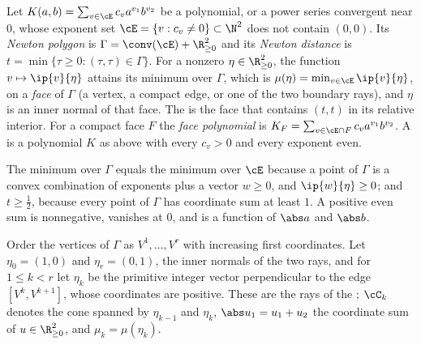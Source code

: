 \begin{refsection}
\begin{definition}\label{def:newton:polygon}
Let $K(a,b)=\sum_{v\in\cE}c_va^{v_1}b^{v_2}$ be a polynomial, or a power series convergent near $0$, whose exponent set $\cE=\{v:c_v\ne0\}\subset\N^2$ does not contain $(0,0)$. Its \emph{Newton polygon} is $\Gamma=\conv(\cE)+\R^2_{\ge0}$ and its \emph{Newton distance} is $t=\min\{\tau\ge0:(\tau,\tau)\in\Gamma\}$. For a nonzero $\eta\in\R^2_{\ge0}$, the function $v\mapsto\ip{v}{\eta}$ attains its minimum over $\Gamma$, which is $\mu(\eta)=\min_{v\in\cE}\ip{v}{\eta}$, on a \emph{face} of $\Gamma$ (a vertex, a compact edge, or one of the two boundary rays), and $\eta$ is an inner normal of that face. The  is the face that contains $(t,t)$ in its relative interior. For a compact face $F$ the \emph{face polynomial} is $K_F=\sum_{v\in\cE\cap F}c_va^{v_1}b^{v_2}$. A  is a polynomial $K$ as above with every $c_v>0$ and every exponent even.
\end{definition}

The minimum over $\Gamma$ equals the minimum over $\cE$ because a point of $\Gamma$ is a convex combination of exponents plus a vector $w\ge0$, and $\ip{w}{\eta}\ge0$; and $t\ge\frac12$, because every point of $\Gamma$ has coordinate sum at least $1$. A positive even sum is nonnegative, vanishes at $0$, and is a function of $\abs a$ and $\abs b$.

Order the vertices of $\Gamma$ as $V^1,\dots,V^r$ with increasing first coordinates. Let $\eta_0=(1,0)$ and $\eta_r=(0,1)$, the inner normals of the two rays, and for $1\le k<r$ let $\eta_k$ be the primitive integer vector perpendicular to the edge $[V^k,V^{k+1}]$, whose coordinates are positive. These are the rays of the ; $\cC_k$ denotes the cone spanned by $\eta_{k-1}$ and $\eta_k$, $\abs u_1=u_1+u_2$ the coordinate sum of $u\in\R^2_{\ge0}$, and $\mu_k=\mu(\eta_k)$.


\end{refsection}
